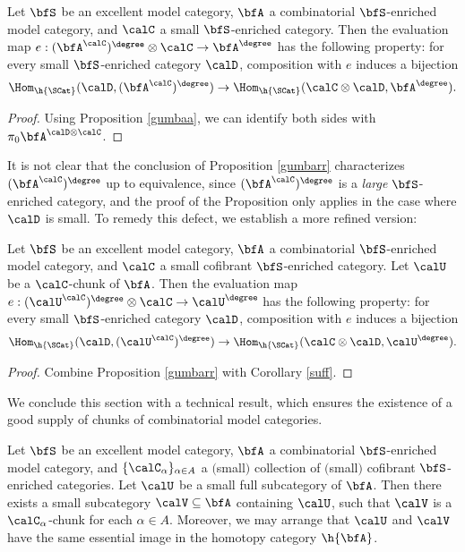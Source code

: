 \begin{Simplicial Categories}
\begin{proposition}\label{gumbarr}
Let $\bfS$ be an excellent model category, $\bfA$ a combinatorial $\bfS$-enriched model category,
and $\calC$ a small $\bfS$-enriched category.
Then the evaluation map
$e: ( \bfA^{\calC})^{\degree} \otimes \calC \rightarrow \bfA^{\degree}$ has
the following property: for every small $\bfS$-enriched category $\calD$, 
composition with $e$ induces a bijection
$$ \Hom_{ \h{\SCat} }( \calD, (\bfA^{\calC})^{\degree} )
\rightarrow \Hom_{ \h{\SCat} }( \calC \otimes \calD, \bfA^{\degree} ).$$
\end{proposition}

\begin{proof}
Using Proposition \ref{gumbaa}, we can identify both sides with
$\pi_0 \bfA^{ \calD \otimes \calC}$. 
\end{proof}

It is not clear that the conclusion of Proposition \ref{gumbarr} characterizes
$(\bfA^{\calC})^{\degree}$ up to equivalence, since
$(\bfA^{\calC})^{\degree}$ is a {\em large} $\bfS$-enriched category, and the
proof of the Proposition only applies in the case where $\calD$ is small.
To remedy this defect, we establish a more refined version:

\begin{corollary}\label{sniffle}
Let $\bfS$ be an excellent model category, $\bfA$ a combinatorial $\bfS$-enriched model category,
and $\calC$ a small cofibrant $\bfS$-enriched category. Let $\calU$ be a
$\calC$-chunk of $\bfA$. 
Then the evaluation map
$e: ( \calU^{\calC})^{\degree} \otimes \calC \rightarrow \calU^{\degree}$ has
the following property: for every small $\bfS$-enriched category $\calD$, 
composition with $e$ induces a bijection
$$ \Hom_{ \h{\SCat} }( \calD, (\calU^{\calC})^{\degree} )
\rightarrow \Hom_{ \h{\SCat} }( \calC \otimes \calD, \calU^{\degree} ).$$
\end{corollary}

\begin{proof}
Combine Proposition \ref{gumbarr} with Corollary \ref{suff}.
\end{proof}

We conclude this section with a technical result, which ensures the existence of a good supply of chunks of combinatorial model categories. 

\begin{lemma}\label{exchunk}
Let $\bfS$ be an excellent model category, $\bfA$ a combinatorial $\bfS$-enriched model category,
and $\{ \calC_\alpha \}_{ \alpha \in A}$ a $($small$)$ collection of $($small$)$ cofibrant
$\bfS$-enriched categories. Let $\calU$ be a small full subcategory of $\bfA$.
Then there exists a small subcategory $\calV \subseteq \bfA$ containing $\calU$, such
that $\calV$ is a $\calC_{\alpha}$-chunk for each $\alpha \in A$. Moreover, we may arrange
that $\calU$ and $\calV$ have the same essential image in the homotopy category
$\h{\bfA}$. 
\end{lemma}


\end{Simplicial Categories}

